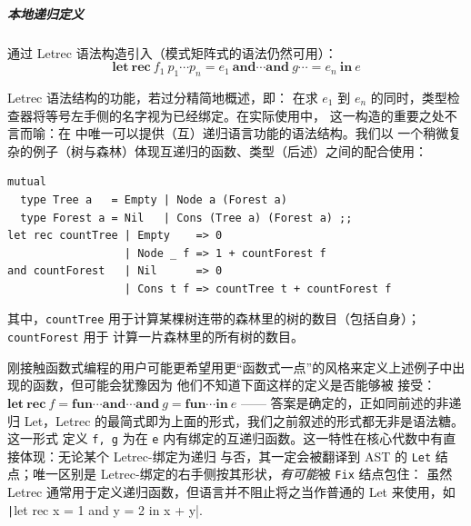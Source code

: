 {\setlength{\parskip}{-1em}
  \subparagraph{本地递归定义} 通过 Letrec 语法构造引入（模式矩阵式的语法仍然可用）：
  \begin{equation}
    \mathbf{let\ rec}\ f_1\ p_1\cdots p_n = e_1\
    \mathbf{and}\cdots \mathbf{and}\ g\cdots = e_n\
    \mathbf{in}\ e
  \end{equation}
}
Letrec 语法结构的功能，若过分精简地概述，即：
在求 \(e_1\) 到 \(e_n\) 的同时，类型检查器将等号左手侧的名字视为已经绑定。在实际使用中，
这一构造的重要之处不言而喻：在 \Tigris 中唯一可以提供（互）递归语言功能的语法结构。我们以
一个稍微复杂的例子（树与森林）体现互递归的函数、类型（后述）之间的配合使用：

\begin{verbatim}
mutual
  type Tree a   = Empty | Node a (Forest a)
  type Forest a = Nil   | Cons (Tree a) (Forest a) ;;
let rec countTree | Empty    => 0
                  | Node _ f => 1 + countForest f
and countForest   | Nil      => 0
                  | Cons t f => countTree t + countForest f
\end{verbatim}

其中，\texttt{countTree} 用于计算某棵树连带的森林里的树的数目（包括自身）；\texttt{countForest} 用于
计算一片森林里的所有树的数目。

刚接触函数式编程的用户可能更希望用更“函数式一点”的风格来定义上述例子中出现的函数，但可能会犹豫因为
他们不知道下面这样的定义是否能够被 \Tigris 接受：
\(\mathbf{let\ rec}\ f = \mathbf{fun}\cdots\mathbf{and}\cdots \mathbf{and}\ g = \mathbf{fun}\cdots
  \mathbf{in}\ e
\) —— 答案是确定的，正如同前述的非递归 Let，Letrec 的最简式即为上面的形式，我们之前叙述的形式都无非是语法糖。这一形式
定义 \texttt{f, g} 为在 \texttt{e} 内有绑定的互递归函数。这一特性在核心代数中有直接体现：无论某个 Letrec-绑定为递归
与否，其一定会被翻译到 AST 的 \texttt{Let} 结点；唯一区别是 Letrec-绑定的右手侧按其形状，\emph{有可能}被 \texttt{Fix} 结点包住：
虽然 Letrec 通常用于定义递归函数，但语言并不阻止将之当作普通的 Let 来使用，如 \texttt|let rec x = 1 and y = 2 in x + y|.

